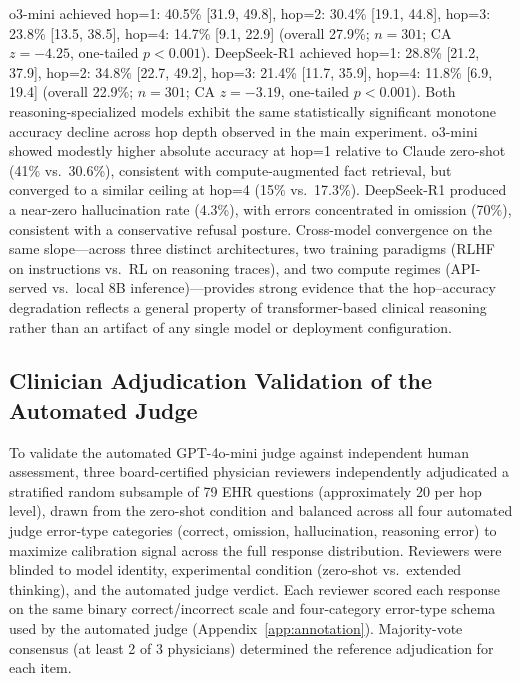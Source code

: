 \documentclass{article}
\begin{document}
o3-mini achieved hop=1: 40.5\% [31.9, 49.8], hop=2: 30.4\% [19.1, 44.8], hop=3: 23.8\% [13.5, 38.5], hop=4: 14.7\% [9.1, 22.9] (overall 27.9\%; $n = 301$; CA $z = -4.25$, one-tailed $p < 0.001$). DeepSeek-R1 achieved hop=1: 28.8\% [21.2, 37.9], hop=2: 34.8\% [22.7, 49.2], hop=3: 21.4\% [11.7, 35.9], hop=4: 11.8\% [6.9, 19.4] (overall 22.9\%; $n = 301$; CA $z = -3.19$, one-tailed $p < 0.001$). Both reasoning-specialized models exhibit the same statistically significant monotone accuracy decline across hop depth observed in the main experiment. o3-mini showed modestly higher absolute accuracy at hop=1 relative to Claude zero-shot (41\% vs.~30.6\%), consistent with compute-augmented fact retrieval, but converged to a similar ceiling at hop=4 (15\% vs.~17.3\%). DeepSeek-R1 produced a near-zero hallucination rate (4.3\%), with errors concentrated in omission (70\%), consistent with a conservative refusal posture. Cross-model convergence on the same slope---across three distinct architectures, two training paradigms (RLHF on instructions vs.\ RL on reasoning traces), and two compute regimes (API-served vs.\ local 8B inference)---provides strong evidence that the hop--accuracy degradation reflects a general property of transformer-based clinical reasoning rather than an artifact of any single model or deployment configuration.

\subsection{Clinician Adjudication Validation of the Automated Judge}
\label{app:clinician_adjudication}

To validate the automated GPT-4o-mini judge against independent human assessment,
three board-certified physician reviewers independently adjudicated a stratified
random subsample of 79 EHR questions (approximately 20 per hop level), drawn from
the zero-shot condition and balanced across all four automated judge error-type
categories (correct, omission, hallucination, reasoning error) to maximize
calibration signal across the full response distribution.
Reviewers were blinded to model identity, experimental condition (zero-shot vs.\
extended thinking), and the automated judge verdict.
Each reviewer scored each response on the same binary correct/incorrect scale and
four-category error-type schema used by the automated judge (Appendix~\ref{app:annotation}).
Majority-vote consensus (at least 2 of 3 physicians) determined the reference
adjudication for each item.
\end{document}
